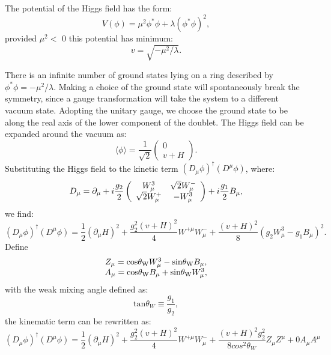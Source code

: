\documentclass[thesis.tex]{subfiles}
\begin{document}
The potential of the Higgs field has the form: 
	\begin{equation}
		V(\phi) = \mu^2\phi^*\phi + \lambda(\phi^*\phi)^2,
	\end{equation}
provided $\mu^2 <$ 0 this potential has minimum: 
	\begin{equation}
		v = \sqrt{ -\mu^2/\lambda}.
	\end{equation}
	
There is an infinite number of ground states lying on a ring described by $\phi^*\phi = - \mu^2/\lambda$. 
Making a choice of the ground state will spontaneously break the symmetry, since a gauge transformation will take the system to a different vacuum state. 
Adopting the unitary gauge, we choose the ground state to be along the real axis of the lower component of the doublet.
The Higgs field can be expanded around the vacuum as:
	\begin{equation}
		\langle \phi \rangle = \frac{1}{\sqrt{2}} \left( \begin{array}{c} 0\\v+H \end{array} \right).
	\end{equation}
Substituting the Higgs field to the kinetic term $(D_\mu \phi)^\dagger(D^\mu\phi)$, where:
	\begin{equation}
		D_\mu = \partial_\mu + i\frac{g_2}{2}\left(  \begin{array}{c c } W_\mu^3  & \sqrt{2}W_\mu^- \\ \sqrt{2}W_\mu^+  & -W_\mu^3 \end{array} \right) + i\frac{g_1}{2}B_\mu, 
	\end{equation}
we find:
	\begin{equation}
		(D_\mu \phi)^\dagger(D^\mu\phi) = \frac{1}{2}(\partial_\mu H)^2 + \frac{g_2^2(v+H)^2}{4}W^{+\mu}W_{\mu}^- + \frac{(v+H)^2}{8}(g_2W_\mu^3 - g_1B_\mu)^2.
	\end{equation}
Define
	\begin{equation}
	\begin{array}{c}
		Z_\mu = \text{cos} \mathrm{\theta_W} W_\mu^3 - \text{sin} \mathrm{\theta_W} B_\mu, \\
		A_\mu = \text{cos} \mathrm{\theta_W} B_\mu + \text{sin} \mathrm{\theta_W} W_\mu^3,
	\end{array}
	\end{equation}
with the weak mixing angle defined as:
	\begin{equation}
		\text{tan} \theta_W \equiv \frac{g_1}{g_2},
	\end{equation}
the kinematic term can be rewritten as:
	\begin{equation}
		(D_\mu \phi)^\dagger(D^\mu\phi) = \frac{1}{2}(\partial_\mu H)^2 + \frac{g_2^2(v+H)^2}{4}W^{+\mu}W_{\mu}^- + \frac{(v+H)^2g_2^2}{8cos^2\theta_W}Z_\mu Z^\mu + 0A_\mu A^\mu
		\label{eq:eathiggs}
	\end{equation}
	
\end{document}
